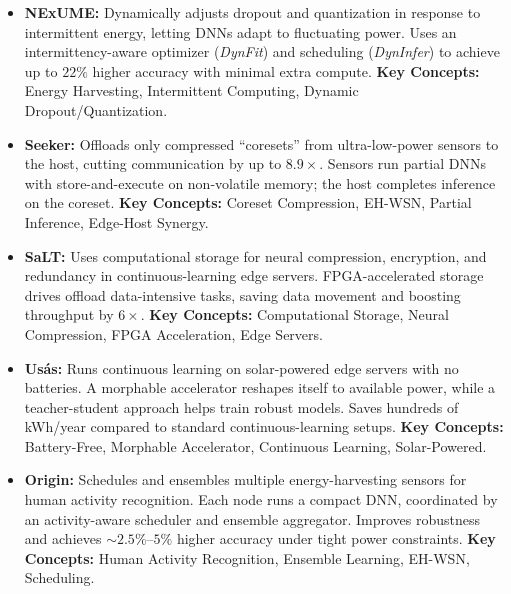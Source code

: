 \documentclass[letterpaper,11pt]{article}
\begin{document}
\begin{itemize}
\item \textbf{NExUME:} Dynamically adjusts dropout and quantization in response to intermittent energy, letting DNNs adapt to fluctuating power. Uses an intermittency-aware optimizer (\emph{DynFit}) and scheduling (\emph{DynInfer}) to achieve up to $22\%$ higher accuracy with minimal extra compute. 
\textbf{Key Concepts:} Energy Harvesting, Intermittent Computing, Dynamic Dropout/Quantization.

\item \textbf{Seeker:} Offloads only compressed ``coresets'' from ultra-low-power sensors to the host, cutting communication by up to $8.9\times$. Sensors run partial DNNs with store-and-execute on non-volatile memory; the host completes inference on the coreset. 
\textbf{Key Concepts:} Coreset Compression, EH-WSN, Partial Inference, Edge-Host Synergy.

\item \textbf{SaLT:} Uses computational storage for neural compression, encryption, and redundancy in continuous-learning edge servers. FPGA-accelerated storage drives offload data-intensive tasks, saving data movement and boosting throughput by $6\times$. 
\textbf{Key Concepts:} Computational Storage, Neural Compression, FPGA Acceleration, Edge Servers.

\item \textbf{Us\'as:} Runs continuous learning on solar-powered edge servers with no batteries. A morphable accelerator reshapes itself to available power, while a teacher-student approach helps train robust models. Saves hundreds of kWh/year compared to standard continuous-learning setups. 
\textbf{Key Concepts:} Battery-Free, Morphable Accelerator, Continuous Learning, Solar-Powered.

\item \textbf{Origin:} Schedules and ensembles multiple energy-harvesting sensors for human activity recognition. Each node runs a compact DNN, coordinated by an activity-aware scheduler and ensemble aggregator. Improves robustness and achieves $\sim 2.5\%$–$5\%$ higher accuracy under tight power constraints. 
\textbf{Key Concepts:} Human Activity Recognition, Ensemble Learning, EH-WSN, Scheduling.
\end{itemize}
\end{document}
